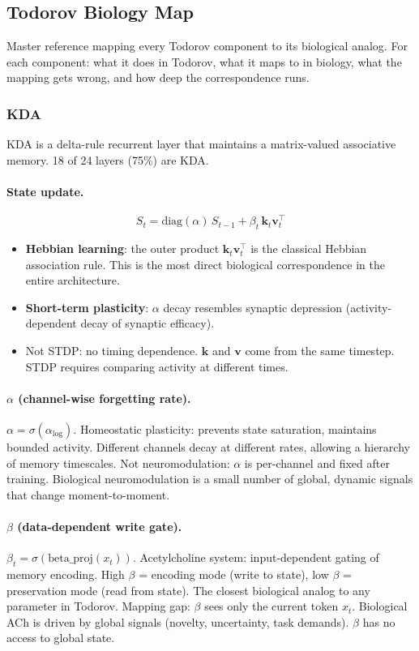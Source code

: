 \documentclass[11pt,a4paper]{article}
\begin{document}
\subsection{Todorov Biology Map}

Master reference mapping every Todorov component to its biological analog. For each component: what it does in Todorov, what it maps to in biology, what the mapping gets wrong, and how deep the correspondence runs.

\subsubsection{KDA}

KDA is a delta-rule recurrent layer that maintains a matrix-valued associative memory. 18 of 24 layers (75\%) are KDA.

\paragraph{State update.}
\[
  S_t = \mathrm{diag}(\alpha)\, S_{t-1} + \beta_t\, \mathbf{k}_t \mathbf{v}_t^\top
\]
\begin{itemize}
  \item \textbf{Hebbian learning}: the outer product $\mathbf{k}_t \mathbf{v}_t^\top$ is the classical Hebbian association rule. This is the most direct biological correspondence in the entire architecture.
  \item \textbf{Short-term plasticity}: $\alpha$ decay resembles synaptic depression (activity-dependent decay of synaptic efficacy).
  \item Not STDP: no timing dependence. $\mathbf{k}$ and $\mathbf{v}$ come from the same timestep. STDP requires comparing activity at different times.
\end{itemize}

\paragraph{$\alpha$ (channel-wise forgetting rate).}
$\alpha = \sigma(\alpha_{\mathrm{log}})$. Homeostatic plasticity: prevents state saturation, maintains bounded activity. Different channels decay at different rates, allowing a hierarchy of memory timescales. Not neuromodulation: $\alpha$ is per-channel and fixed after training. Biological neuromodulation is a small number of global, dynamic signals that change moment-to-moment.

\paragraph{$\beta$ (data-dependent write gate).}
$\beta_t = \sigma(\mathrm{beta\_proj}(x_t))$. Acetylcholine system: input-dependent gating of memory encoding. High $\beta$ = encoding mode (write to state), low $\beta$ = preservation mode (read from state). The closest biological analog to any parameter in Todorov. Mapping gap: $\beta$ sees only the current token $x_t$. Biological ACh is driven by global signals (novelty, uncertainty, task demands). $\beta$ has no access to global state.
\end{document}
